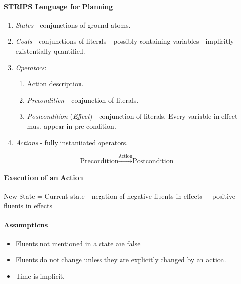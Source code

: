\documentclass[twocolumn,english]{article}
\begin{document}
\paragraph{STRIPS Language for Planning}
\begin{enumerate}
\item \emph{States} - conjunctions of ground atoms.
\item \emph{Goals} - conjunctions of literals - possibly containing variables
- implicitly existentially quantified.
\item \emph{Operators}:
\begin{enumerate}
\item Action description.
\item \emph{Precondition} - conjunction of literals.
\item \emph{Postcondition} (\emph{Effect}) - conjunction of literals. Every
variable in effect must appear in pre-condition.
\end{enumerate}
\item \emph{Actions} - fully instantiated operators.
\end{enumerate}
\[
\text{Precondition}\xrightarrow{\text{Action}}\text{Postcondition}
\]

\paragraph{Execution of an Action}

New State = Current state - negation of negative fluents in effects
+ positive fluents in effects

\paragraph{Assumptions}
\begin{itemize}
\item Fluents not mentioned in a state are false.
\item Fluents do not change unless they are explicitly changed by an action.
\item Time is implicit.
\end{itemize}
\end{document}
